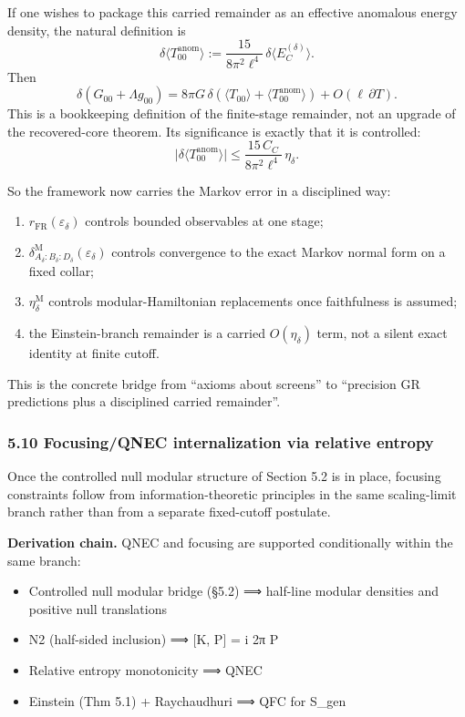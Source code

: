 If one wishes to package this carried remainder as an effective anomalous energy density, the natural definition is
\[
\delta\langle T_{00}^{\mathrm{anom}}\rangle
:=
\frac{15}{8\pi^2\ell^4}\,
\delta\langle E_C^{(\delta)}\rangle.
\]
Then
\[
\delta\!\left(G_{00}+\Lambda g_{00}\right)
=
8\pi G\,
\delta\!\left(
\langle T_{00}\rangle
+
\langle T_{00}^{\mathrm{anom}}\rangle
\right)
+
O(\ell\,\partial T).
\]
This is a bookkeeping definition of the finite-stage remainder, not an upgrade of the recovered-core theorem. Its significance is exactly that it is controlled:
\[
\bigl|
\delta\langle T_{00}^{\mathrm{anom}}\rangle
\bigr|
\le
\frac{15\,C_C}{8\pi^2\ell^4}\,
\eta_\delta.
\]

So the framework now carries the Markov error in a disciplined way:
\begin{enumerate}
\def\labelenumi{\arabic{enumi}.}
\tightlist
\item
\(r_{\mathrm{FR}}(\varepsilon_\delta)\) controls bounded observables at one stage;
\item
\(\delta^{\mathrm M}_{A_\delta:B_\delta:D_\delta}(\varepsilon_\delta)\) controls convergence to the exact Markov normal form on a fixed collar;
\item
\(\eta_\delta^{\mathrm M}\) controls modular-Hamiltonian replacements once faithfulness is assumed;
\item
the Einstein-branch remainder is a carried \(O(\eta_\delta)\) term, not a silent exact identity at finite cutoff.
\end{enumerate}

This is the concrete bridge from ``axioms about screens'' to ``precision GR predictions plus a disciplined carried remainder''.

\subsubsection{5.10 Focusing/QNEC internalization via relative entropy}\label{510-focusingqnec-internalization-via-relative-entropy}

Once the controlled null modular structure of Section 5.2 is in place, focusing constraints follow from information-theoretic principles in the same scaling-limit branch rather than from a separate fixed-cutoff postulate.

\textbf{Derivation chain.} QNEC and focusing are supported conditionally within the same branch:

\begin{itemize}
\tightlist
\item
  Controlled null modular bridge (§5.2) ⟹ half-line modular densities and positive null translations
\item
  N2 (half-sided inclusion) ⟹ {[}K, P{]} = i 2π P
\item
  Relative entropy monotonicity ⟹ QNEC
\item
  Einstein (Thm 5.1) + Raychaudhuri ⟹ QFC for S\_gen
\end{itemize}

